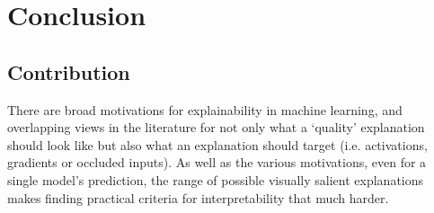 \documentclass[main]{subfiles}
\begin{document}
\chapter{Conclusion}








\section{Contribution}
There are broad motivations for explainability in machine learning, and overlapping views in the literature for not only what a `quality' explanation should look like but also what an explanation should target (i.e. activations, gradients or occluded inputs). As well as the various motivations, even for a single model's prediction, the range of possible visually salient explanations makes finding practical criteria for interpretability that much harder.
\end{document}
